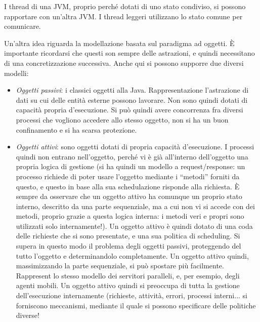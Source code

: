 I thread di una JVM, proprio perché dotati di uno stato condiviso, si possono rapportare con un'altra JVM. I thread
leggeri utilizzano lo stato comune per comunicare.

Un'altra idea riguarda la modellazione basata sul paradigma ad oggetti. È importante ricordarsi che questi son sempre
delle astrazioni, e quindi necessitano di una concretizzazione successiva. Anche qui si possono supporre due diversi
modelli:
\begin{itemize}
 \item \textit{Oggetti passivi}: i classici oggetti alla Java. Rappresentazione l'astrazione di dati su cui delle entità
esterne possono lavorare. Non sono quindi dotati di capacità propria d'esecuzione. Si può quindi avere concorrenza
fra diversi processi che vogliono accedere allo stesso oggetto, non si ha un buon confinamento e si ha scarsa
protezione.
  \item \textit{Oggetti attivi}: sono oggetti dotati di propria capacità d'esecuzione. I processi quindi non entrano
nell'oggetto, perché vi è già all'interno dell'oggetto una propria logica di gestione (si ha quindi un modello a
request/response: un processo richiede di poter usare l'oggetto mediante i ``metodi'' forniti da questo, e questo in
base alla sua schedulazione risponde alla richiesta. È sempre da osservare che un oggetto attivo ha comunque un proprio
stato interno, descritto da una parte sequenziale, ma a cui non vi si accede con dei metodi, proprio grazie a questa
logica interna: i metodi veri e propri sono utilizzati solo internamente!). Un oggetto attivo è quindi dotato di una
coda delle richieste che si sono presentate, e una sua politica di scheduling. Si supera in questo modo il problema
degli oggetti passivi, proteggendo del tutto l'oggetto e determinandolo completamente. Un oggetto attivo quindi,
massimizzando la parte sequenziale, si può spostare più facilmente. Rappresent lo stesso modello dei servitori
paralleli, e, per esempio, degli agenti mobili. Un oggetto attivo quindi si preoccupa di tutta la gestione
dell'esecuzione internamente (richieste, attività, errori, processi interni... si forniscono meccanismi, mediante il
quale si possono specificare delle politiche diverse!
\end{itemize}


